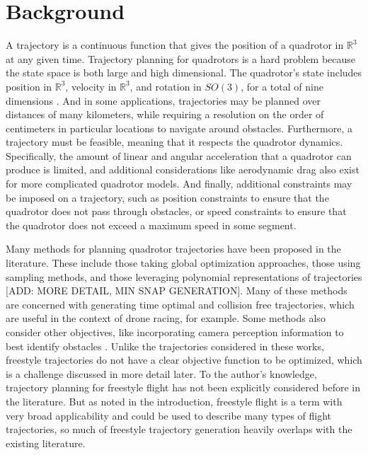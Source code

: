 \documentclass[pageno]{jpaper}
\begin{document}
\section{Background}

A trajectory is a continuous function that gives the position of a quadrotor in $\mathbb{R}^3$ at any given time. Trajectory planning for quadrotors is a hard problem because the state space is both large and high dimensional. The quadrotor's state includes position in $\mathbb{R}^3$, velocity in $\mathbb{R}^3$, and rotation in $SO(3)$, for a total of nine dimensions \cite{mueller}. And in some applications, trajectories may be planned over distances of many kilometers, while requiring a resolution on the order of centimeters in particular locations to navigate around obstacles. Furthermore, a trajectory must be feasible, meaning that it respects the quadrotor dynamics. Specifically, the amount of linear and angular acceleration that a quadrotor can produce is limited, and additional considerations like aerodynamic drag also exist for more complicated quadrotor models. And finally, additional constraints may be imposed on a trajectory, such as position constraints to ensure that the quadrotor does not pass through obstacles, or speed constraints to ensure that the quadrotor does not exceed a maximum speed in some segment.

Many methods for planning quadrotor trajectories have been proposed in the literature. These include those taking global optimization approaches, those using sampling methods, and those leveraging polynomial representations of trajectories \cite{hanover} [ADD: MORE DETAIL, MIN SNAP GENERATION]. Many of these methods are concerned with generating time optimal and collision free trajectories, which are useful in the context of drone racing, for example. Some methods also consider other objectives, like incorporating camera perception information to best identify obstacles \cite{zhou}. Unlike the trajectories considered in these works, freestyle trajectories do not have a clear objective function to be optimized, which is a challenge discussed in more detail later. To the author's knowledge, trajectory planning for freestyle flight has not been explicitly considered before in the literature. But as noted in the introduction, freestyle flight is a term with very broad applicability and could be used to describe many types of flight trajectories, so much of freestyle trajectory generation heavily overlaps with the existing literature.
\end{document}
